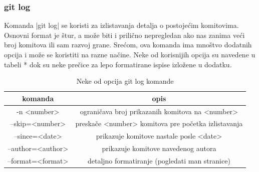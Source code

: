 \documentclass[a4paper]{article}
\begin{document}
{\subsubsection*{git log}
\label{log}
Komanda |git log| se koristi za izlistavanja detalja o postojećim komitovima. Osnovni format je štur, a može biti i prilično nepregledan ako nas zanima veći broj komitova ili sam razvoj grane. Srećom, ova komanda ima mnoštvo dodatnih opcija i može se koristiti na razne načine. Neke od korisnijih opcija su navedene u tabeli * dok su neke prečice za lepo formatirane ispise izložene u dodatku. 

\begin{table}[h!]
\begin{center}


\begin{tabular}{cc} \hline
komanda & opis\\ \hline
-n <number> & ograničava broj prikazanih komitova na <number> \\
--skip=<number> & preskače <number> komitova pre početka izlistavanja \\
--since=<date> & prikazuje komitove nastale posle <date> \\
--author=<author> & prikazuje komitove navedenog autora \\
--format=<format> & detaljno formatiranje (pogledati man stranice)
\end{tabular}
\caption{Neke od opcija git log komande}
\end{center}
\label{tab:tabela1}

\end{table}


}
\end{document}
